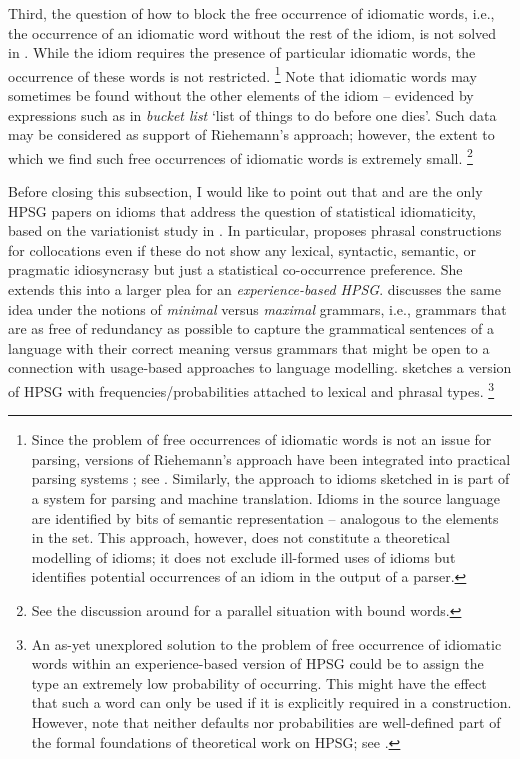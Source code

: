 \documentclass[output=paper
                ,modfonts
                ,nonflat
	        ,collection
	        ,collectionchapter
	        ,collectiontoclongg
 	        ,biblatex
                ,babelshorthands
                ,newtxmath
                ,draftmode
                ,colorlinks, citecolor=brown
]{./langsci/langscibook}
\begin{document}
Third, the question of how to block the free occurrence of idiomatic words, i.e., the occurrence of an idiomatic word without the rest of the idiom, is not solved in \citet{Riehemann2001a}. While the idiom requires the presence of particular idiomatic words, the occurrence of these words is not restricted.%
\footnote{Since the problem of free occurrences of idiomatic words is not an issue for parsing, versions of Riehemann's approach have been integrated into practical parsing systems \citep{Villavicencio:Copestake:02}; see . 
Similarly, the approach to idioms sketched in \citet{Flickinger:15Slides2} 
is part of a system for parsing and machine translation. Idioms in the source language are identified by bits of semantic representation -- analogous to the elements in the  set. This approach, however, does not constitute a theoretical modelling of idioms; it does not exclude ill-formed uses of idioms but identifies potential occurrences of an idiom in the output of a parser.}
Note that idiomatic words may sometimes be found without the other elements of the idiom -- evidenced by expressions such as in \emph{bucket list} `list of things to do before one dies'.
Such data may be considered as support of Riehemann's approach; however, the extent to which we find such free occurrences of idiomatic words is extremely small.%
\footnote{See the discussion around  for a parallel situation with bound words.}


Before closing this subsection, I would like to point out that 
\citet{Riehemann2001a} and \citet{RB99a} are the only HPSG papers on idioms that address the question of statistical idiomaticity, based on the variationist study in \citet{Bender2000a}. 
In particular, \citet[--301]{Riehemann2001a} proposes phrasal constructions for collocations even if these do not show any lexical, syntactic, semantic, or pragmatic idiosyncrasy but just a statistical co-occurrence preference. 
She extends this into a larger plea for an \emph{experience-based HPSG}. 
%
\citet{Bender2000a} discusses the same idea under the notions of \emph{minimal} versus \emph{maximal} grammars, i.e., grammars that are as free of redundancy as possible to capture the grammatical sentences of a language with their correct meaning versus grammars that might be open to a connection with usage-based approaches to language modelling.
\citet[]{Bender2000a} sketches a version of HPSG with frequencies/probabilities attached to lexical and phrasal types.%
\footnote{An as-yet unexplored solution to the problem of free occurrence of idiomatic words within an experience-based version of HPSG could be to assign the type  an extremely low probability of occurring. This might have the effect that such a word can only be used if it is explicitly required in a construction. However, note that neither defaults nor probabilities are well-defined part of the formal foundations of theoretical work on HPSG; see .}
\end{document}
